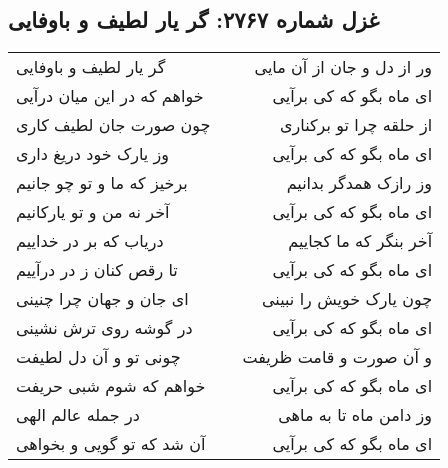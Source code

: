 \begin{center}
\section*{غزل شماره ۲۷۶۷: گر یار لطیف و باوفایی}
\label{sec:2767}
\begin{longtable}{l p{0.5cm} r}
گر یار لطیف و باوفایی
&&
ور از دل و جان از آن مایی
\\
خواهم که در این میان درآیی
&&
ای ماه بگو که کی برآیی
\\
چون صورت جان لطیف کاری
&&
از حلقه چرا تو برکناری
\\
وز یارک خود دریغ داری
&&
ای ماه بگو که کی برآیی
\\
برخیز که ما و تو چو جانیم
&&
وز رازک همدگر بدانیم
\\
آخر نه من و تو یارکانیم
&&
ای ماه بگو که کی برآیی
\\
دریاب که بر در خداییم
&&
آخر بنگر که ما کجاییم
\\
تا رقص کنان ز در درآییم
&&
ای ماه بگو که کی برآیی
\\
ای جان و جهان چرا چنینی
&&
چون یارک خویش را نبینی
\\
در گوشه روی ترش نشینی
&&
ای ماه بگو که کی برآیی
\\
چونی تو و آن دل لطیفت
&&
و آن صورت و قامت ظریفت
\\
خواهم که شوم شبی حریفت
&&
ای ماه بگو که کی برآیی
\\
در جمله عالم الهی
&&
وز دامن ماه تا به ماهی
\\
آن شد که تو گویی و بخواهی
&&
ای ماه بگو که کی برآیی
\\
\end{longtable}
\end{center}
